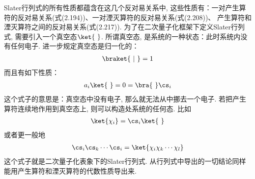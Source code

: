 
Slater行列式的所有性质都蕴含在这几个反对易关系中, 
这些性质有：一对产生算符的反对易关系(式(2.194))、一对湮灭算符的反对易关系(式(2.208))、 产生算符和湮灭算符之间的反对易关系(式(2.217)). 
为了在二次量子化框架下定义Slater行列式, 
需要引入一个真空态$\ket{\,\,}$. 
所谓真空态, 是系统的一种状态：此时系统内没有任何电子. 进一步规定真空态是归一化的：
\begin{align}
\braket{\,\,|\,\,} = 1
\end{align} 
而且有如下性质：
\begin{align}
a_i \ket{\,\,} = 0 = \bra{\,\,} \cs_i
\end{align}
这个式子的意思是：真空态中没有电子, 
那么就无法从中挪去一个电子. 
若把产生算符连续地作用到真空态上, 
则可以构造处系统的任何态. 
比如
\begin{align}
\ket{\chi_i} = \cs_i\ket{\,\,}
\end{align}
或者更一般地
\begin{align}
\cs_i\cs_k\cdots\cs_i = \ket{\chi_i\chi_k\cdots\chi_l}
\end{align}
这个式子就是二次量子化表象下的Slater行列式. 
从行列式中导出的一切结论同样能用产生算符和湮灭算符的代数性质导出来. 


